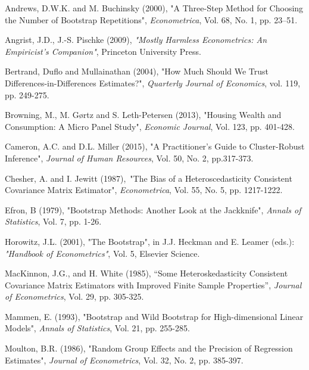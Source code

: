 \documentclass{article}
\begin{document}
\begin{thebibliography}{99}
 Andrews, D.W.K. and M. Buchinsky
(2000), "A Three-Step Method for Choosing the Number of Bootstrap
Repetitions", \emph{Econometrica}, Vol. 68, No. 1, pp. 23--51.

 Angrist, J.D., J.-S. Pischke (2009), 
\emph{"Mostly Harmless Econometrics: An Empiricist's Companion"}, Princeton
University Press.

 Bertrand, Duflo and
Mullainathan (2004), "How Much Should We Trust Differences-in-Differences
Estimates?", \emph{Quarterly Journal of Economics}, vol. 119, pp. 249-275.

 Browning, M., M. G\o rtz and S.
Leth-Petersen (2013), "Housing Wealth and Consumption: A Micro Panel Study", 
\emph{Economic Journal}, Vol. 123, pp. 401-428.

 Cameron, A.C. and D.L. Miller (2015), "A
Practitioner's Guide to Cluster-Robust Inference", \emph{Journal of Human
Resources}, Vol. 50, No. 2, pp.317-373.

 Chesher, A. and I. Jewitt (1987),\ "The
Bias of a Heteroscedasticity Consistent Covariance Matrix Estimator", \emph{%
Econometrica}, Vol. 55, No. 5, pp. 1217-1222.

 Efron, B (1979), "Bootstrap Methods: Another Look at
the Jackknife", \emph{Annals of Statistics}, Vol. 7, pp. 1-26.

 Horowitz, J.L. (2001), "The Bootstrap", in J.J.
Heckman and E. Leamer (eds.): \emph{"Handbook of Econometrics"}, Vol. 5,
Elsevier Science.

 MacKinnon, J.G., and H. White (1985),
\textquotedblleft Some Heteroskedasticity Consistent Covariance Matrix
Estimators with Improved Finite Sample Properties\textquotedblright , \emph{%
Journal of Econometrics}, Vol. 29, pp. 305-325.

 Mammen, E. (1993), "Bootstrap and Wild Bootstrap for
High-dimensional Linear Models", \emph{Annals of Statistics}, Vol. 21, pp.
255-285.

 Moulton, B.R. (1986), "Random Group Effects and the
Precision of Regression Estimates", \emph{Journal of Econometrics}, Vol. 32,
No. 2, pp. 385-397.


\end{thebibliography}
\end{document}
